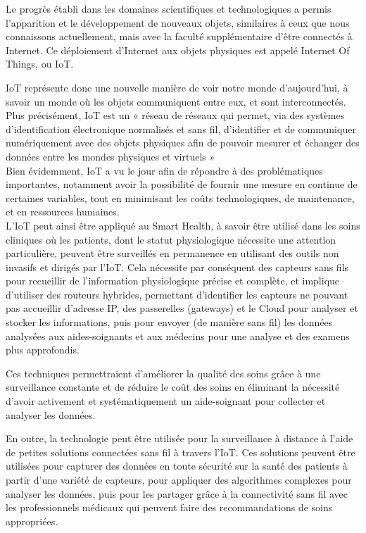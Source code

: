 Le progrès établi dans les domaines scientifiques et technologiques a permis l’apparition et le développement de nouveaux objets, similaires à ceux que nous connaissons actuellement, mais avec la faculté supplémentaire d’être connectés à Internet. Ce déploiement d’Internet aux objets physiques est appelé Internet Of Things, ou IoT.

IoT représente donc une nouvelle manière de voir notre monde d’aujourd'hui, à savoir un monde où les objets communiquent entre eux, et sont interconnectés. Plus précisément, IoT est un « réseau de réseaux qui permet, via des systèmes d’identification électronique normalisés et sans fil, d’identifier et de communiquer numériquement avec des objets physiques afin de pouvoir mesurer et échanger des données entre les mondes physiques et virtuels » \cite{benghozi2009internet}
\\

Bien évidemment, IoT a vu le jour afin de répondre à des problématiques importantes, notamment avoir la possibilité de fournir une mesure en continue de certaines variables, tout en minimisant les coûts technologiques, de maintenance, et en ressources humaines.
\\

L’IoT peut ainsi être appliqué au Smart Health, à savoir être utilisé dans les soins cliniques où les patients, dont le statut physiologique nécessite une attention particulière, peuvent être surveillés en permanence en utilisant des outils non invasifs et dirigés par l’IoT. Cela nécessite par conséquent des capteurs sans fils pour recueillir de l'information physiologique précise et complète, et implique d’utiliser des routeurs hybrides, permettant d'identifier les capteurs ne pouvant pas accueillir d'adresse IP, des passerelles (gateways) et le Cloud pour analyser et stocker les informations, puis pour envoyer (de manière sans fil) les données analysées aux aides-soignants et aux médecins pour une analyse et des examens plus approfondis.

Ces techniques permettraient d’améliorer la qualité des soins grâce à une surveillance constante et de réduire le coût des soins en éliminant la nécessité d’avoir activement et systématiquement un aide-soignant pour collecter et analyser les données.

En outre, la technologie peut être utilisée pour la surveillance à distance à l'aide de petites solutions connectées sans fil à travers l'IoT. Ces solutions peuvent être utilisées pour capturer des données en toute sécurité sur la santé des patients à partir d'une variété de capteurs, pour appliquer des algorithmes complexes pour analyser les données, puis pour les partager grâce à la connectivité sans fil avec les professionnels médicaux qui peuvent faire des recommandations de soins appropriées.

